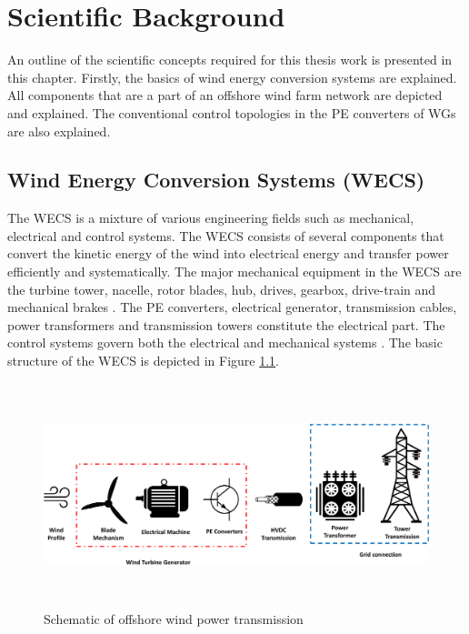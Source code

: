 \chapter{Scientific Background}\label{2}
An outline of the scientific concepts required for this thesis work is presented in this chapter. Firstly, the basics of wind energy conversion systems are explained. All components that are a part of an offshore wind farm network are depicted and explained. The conventional control topologies in the \gls{PE} converters of \gls{WG}s are also explained.

\section{Wind Energy Conversion Systems (WECS)}\label{WECS_theory}
The \gls{WECS} is a mixture of various engineering fields such as mechanical, electrical and control systems. The \gls{WECS} consists of several components that convert the kinetic energy of the wind into electrical energy and transfer power efficiently and systematically. The major mechanical equipment in the \gls{WECS} are the turbine tower, nacelle, rotor blades, hub, drives, gearbox, drive-train and mechanical brakes \cite{manwell2010wind}. The \gls{PE} converters, electrical generator, transmission cables, power transformers and transmission towers constitute the electrical part. The control systems govern both the electrical and mechanical systems \cite{yaramasu_high-power_2015}.
The basic structure of the \gls{WECS} is depicted in Figure \ref{fig:WECS}.   

\begin{figure}[H]
\centering
    \includegraphics[height = 6.5cm,width = \textwidth]{Diagrams/Chapter_2/WECS.pdf}
    \caption{Schematic of offshore wind power transmission}
    \label{fig:WECS}
\end{figure}

